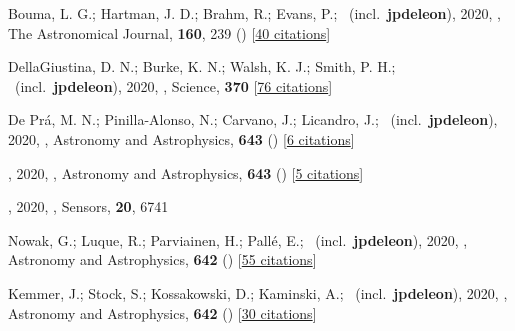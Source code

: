 \item[{\color{numcolor}\scriptsize132}] Bouma, L. G.; Hartman, J. D.; Brahm, R.; Evans, P.; \etal\ (incl.\ \textbf{jpdeleon}), 2020, , The Astronomical Journal, \textbf{160}, 239 () [\href{https://ui.adsabs.harvard.edu/abs/2020AJ....160..239B}{40 citations}]

\item[{\color{numcolor}\scriptsize131}] DellaGiustina, D. N.; Burke, K. N.; Walsh, K. J.; Smith, P. H.; \etal\ (incl.\ \textbf{jpdeleon}), 2020, , Science, \textbf{370} [\href{https://ui.adsabs.harvard.edu/abs/2020Sci...370.3660D}{76 citations}]

\item[{\color{numcolor}\scriptsize130}] De Pr{\'a}, M. N.; Pinilla-Alonso, N.; Carvano, J.; Licandro, J.; \etal\ (incl.\ \textbf{jpdeleon}), 2020, , Astronomy and Astrophysics, \textbf{643} () [\href{https://ui.adsabs.harvard.edu/abs/2020A&A...643A.102D}{6 citations}]

\item[{\color{numcolor}\scriptsize129}] , 2020, , Astronomy and Astrophysics, \textbf{643} () [\href{https://ui.adsabs.harvard.edu/abs/2020A&A...643A.107M}{5 citations}]

\item[{\color{numcolor}\scriptsize128}] , 2020, , Sensors, \textbf{20}, 6741

\item[{\color{numcolor}\scriptsize127}] Nowak, G.; Luque, R.; Parviainen, H.; Pall{\'e}, E.; \etal\ (incl.\ \textbf{jpdeleon}), 2020, , Astronomy and Astrophysics, \textbf{642} () [\href{https://ui.adsabs.harvard.edu/abs/2020A&A...642A.173N}{55 citations}]

\item[{\color{numcolor}\scriptsize126}] Kemmer, J.; Stock, S.; Kossakowski, D.; Kaminski, A.; \etal\ (incl.\ \textbf{jpdeleon}), 2020, , Astronomy and Astrophysics, \textbf{642} () [\href{https://ui.adsabs.harvard.edu/abs/2020A&A...642A.236K}{30 citations}]

